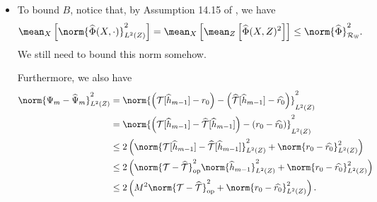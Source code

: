 \begin{itemize}
    \item To bound $ B $, notice that, by Assumption 14.15 of \cite{sugiyama2012}, we have
        \begin{equation*}
            \mean_{ X } \left[
                \norm{ \hat{ \Phi } ( X, \cdot ) }_{ L^{ 2 } ( Z ) }^2
            \right]
            = \mean_{ X } \left[
                \mean_{ Z } \left[
                    \hat{ \Phi } ( X, Z )^2
                \right]
            \right]
            \leq \norm{ \hat{ \Phi } }_{ \mathcal{R}_{ \mathbb{W} } }^2
        .\end{equation*}
        {\color{red} We still need to bound this norm somehow.}

        Furthermore, we also have
        \begin{align*}
            \norm{ \Psi_{ m } - \hat{ \Psi }_{ m } }_{ L^{ 2 } ( Z ) }^2
            &= \norm{
                \left(
                    \mathcal{T} [ \hat{ h }_{ m-1 } ] - r_{ 0 }
                \right)
                - \left(
                    \hat{ \mathcal{T} } [ \hat{ h }_{ m-1 } ] - \hat{ r_{ 0 } }
                \right)
            }_{ L^{ 2 } ( Z ) }^2 \\
            &= \norm{
                \left(
                    \mathcal{T} [ \hat{ h }_{ m-1 } ]
                    - \hat{ \mathcal{T} } [ \hat{ h }_{ m-1 } ]
                \right)
                - \left(
                    r_{ 0 } - \hat{ r_{ 0 } }
                \right)
            }_{ L^{ 2 } ( Z ) }^2 \\
            &\leq 2 \left(
                \norm{
                    \mathcal{T} [ \hat{ h }_{ m-1 } ]
                    - \hat{ \mathcal{T} } [ \hat{ h }_{ m-1 } ]
                }_{ L^{ 2 } ( Z ) }^2
                + \norm{
                    r_{ 0 } - \hat{ r_{ 0 } }
                }_{ L^{ 2 } ( Z ) }^2
            \right) \\
            &\leq 2 \left(
                \norm{ \mathcal{T} - \hat{ \mathcal{T} } }_{ \mathrm{op} }^2
                \norm{
                    \hat{ h }_{ m-1 }
                }_{ L^{ 2 } ( Z ) }^2
                + \norm{
                    r_{ 0 } - \hat{ r_{ 0 } }
                }_{ L^{ 2 } ( Z ) }^2
            \right) \\
            &\leq 2 \left(
                M^2 \norm{ \mathcal{T} - \hat{ \mathcal{T} } }_{ \mathrm{op} }^2
                + \norm{
                    r_{ 0 } - \hat{ r_{ 0 } }
                }_{ L^{ 2 } ( Z ) }^2
            \right)
        .\end{align*}

\end{itemize}
